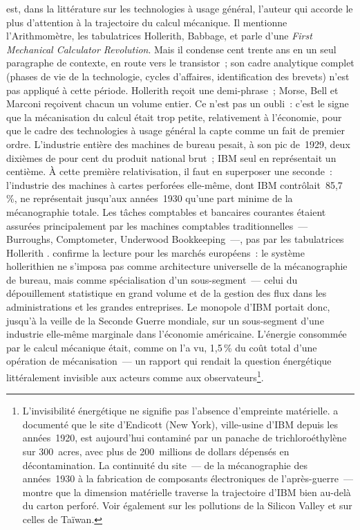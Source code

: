 \textcite{kooij_information_2022} est, dans la littérature sur les technologies à usage général, l'auteur qui accorde le plus d'attention à la trajectoire du calcul mécanique. Il mentionne l'Arithmomètre, les tabulatrices Hollerith, Babbage, et parle d'une \og \emph{First Mechanical Calculator Revolution}\fg{}. Mais il condense cent trente ans en un seul paragraphe de contexte, en route vers le transistor~; son cadre analytique complet (phases de vie de la technologie, cycles d'affaires, identification des brevets) n'est pas appliqué à cette période. Hollerith reçoit une demi-phrase~; Morse, Bell et Marconi reçoivent chacun un volume entier. Ce n'est pas un oubli~: c'est le signe que la mécanisation du calcul était trop petite, relativement à l'économie, pour que le cadre des technologies à usage général la capte comme un fait de premier ordre. L'industrie entière des machines de bureau pesait, à son pic de~1929, deux dixièmes de pour cent du produit national brut~; IBM seul en représentait un centième. À cette première relativisation, il faut en superposer une seconde~: l'industrie des machines à cartes perforées elle-même, dont IBM contrôlait~85,7\,\%, ne représentait jusqu'aux années~1930 qu'une part minime de la mécanographie totale. Les tâches comptables et bancaires courantes étaient assurées principalement par les machines comptables traditionnelles~--- Burroughs, Comptometer, Underwood Bookkeeping~---, pas par les tabulatrices Hollerith \parencite[p.~158]{cortada_before_1993}. \textcite{heide_punched_2009} confirme la lecture pour les marchés européens~: le système hollerithien ne s'imposa pas comme architecture universelle de la mécanographie de bureau, mais comme spécialisation d'un sous-segment~--- celui du dépouillement statistique en grand volume et de la gestion des flux dans les administrations et les grandes entreprises. Le monopole d'IBM portait donc, jusqu'à la veille de la Seconde Guerre mondiale, sur un sous-segment d'une industrie elle-même marginale dans l'économie américaine. L'énergie consommée par le calcul mécanique était, comme on l'a vu, 1,5\,\% du coût total d'une opération de mécanisation~--- un rapport qui rendait la question énergétique littéralement invisible aux acteurs comme aux observateurs\footnote{L'invisibilité énergétique ne signifie pas l'absence d'empreinte matérielle. \textcite{little_toxic_2014} a documenté que le site d'Endicott (New York), ville-usine d'IBM depuis les années~1920, est aujourd'hui contaminé par un panache de trichloroéthylène sur 300~acres, avec plus de 200~millions de dollars dépensés en décontamination. La continuité du site~--- de la mécanographie des années~1930 à la fabrication de composants électroniques de l'après-guerre~--- montre que la dimension matérielle traverse la trajectoire d'IBM bien au-delà du carton perforé. Voir également \textcite{lecuyer_clean_2017} sur les pollutions de la Silicon Valley et \textcite{chiu_dark_2011} sur celles de Taïwan.}.

